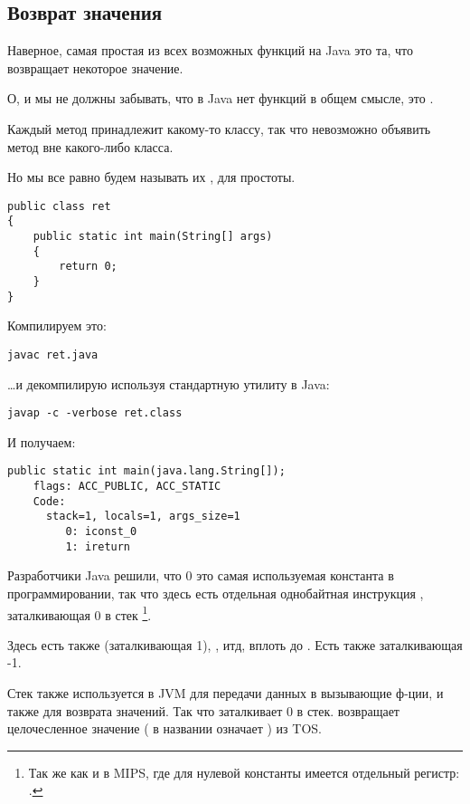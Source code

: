 \subsection{Возврат значения}

Наверное, самая простая из всех возможных функций на Java это та, что возвращает 
некоторое значение.

О, и мы не должны забывать, что в Java нет  функций в общем смысле,
это .

Каждый метод принадлежит какому-то классу, так что невозможно объявить метод 
вне какого-либо класса.

Но мы все равно будем называть их , для простоты.

\begin{lstlisting}[style=customjava]
public class ret
{
	public static int main(String[] args) 
	{
		return 0;
	}
}
\end{lstlisting}

Компилируем это:

\begin{lstlisting}
javac ret.java
\end{lstlisting}

\dots и декомпилирую используя стандартную утилиту в Java:

\begin{lstlisting}
javap -c -verbose ret.class
\end{lstlisting}

И получаем:

\begin{lstlisting}[caption=JDK 1.7 (excerpt)]
  public static int main(java.lang.String[]);
    flags: ACC_PUBLIC, ACC_STATIC
    Code:
      stack=1, locals=1, args_size=1
         0: iconst_0      
         1: ireturn       
\end{lstlisting}

Разработчики Java решили, что 0 это самая используемая константа в программировании,
так что здесь есть отдельная однобайтная инструкция , заталкивающая 0 в стек
\footnote{Так же как и в MIPS, где для нулевой константы имеется отдельный регистр: .}.

Здесь есть также  (заталкивающая 1), , итд, 
вплоть до .
Есть также  заталкивающая -1.

Стек также используется в JVM для передачи данных в вызывающие ф-ции, и также для возврата значений.
Так что  заталкивает 0 в стек.
 возвращает целочесленное значение ( в названии означает ) из \ac{TOS}.

